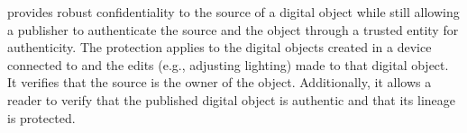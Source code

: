 \name provides robust confidentiality to the source of a digital object while still allowing a publisher to authenticate the source and the object through a trusted entity for authenticity. The protection applies to the digital objects created in a device connected to \name and the edits (e.g.,  adjusting lighting) made to that digital object. It verifies that the source is the owner of the object. Additionally, it allows a reader to verify that the published digital object is authentic and that its lineage is protected. 
